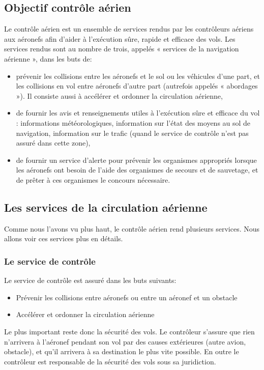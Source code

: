     \subsection{Objectif contrôle aérien}
Le contrôle aérien est un ensemble de services  rendus par les contrôleurs aériens aux aéronefs afin d'aider à l'exécution sûre, rapide et efficace des vols. Les services rendus sont au nombre de trois, appelés « services de la navigation aérienne », dans les buts de:
\begin{itemize}
    \item prévenir les collisions entre les aéronefs et le sol ou les véhicules d'une part, et les collisions en vol entre aéronefs d'autre part (autrefois appelés « abordages »). Il consiste aussi à accélérer et ordonner la circulation aérienne,
    \item de fournir les avis et renseignements utiles à l'exécution sûre et efficace du vol : informations météorologiques, information sur l'état des moyens au sol de navigation, information sur le trafic (quand le service de contrôle n'est pas assuré dans cette zone),
    \item de fournir un service d'alerte pour prévenir les organismes appropriés lorsque les aéronefs ont besoin de l'aide des organismes de secours et de sauvetage, et de prêter à ces organismes le concours nécessaire.
\end{itemize}\medskip

    \subsection{Les services de la circulation aérienne\label{servicesaerien}}
Comme nous l'avons vu plus haut, le contrôle aérien rend plusieurs services. Nous allons voir ces services plus en détails.

        \subsubsection{Le service de contrôle}
Le service de contrôle est assuré dans les buts suivants:
\begin{itemize}
    \item Prévenir les collisions entre aéronefs ou entre un aéronef et un obstacle
    \item Accélérer et ordonner la circulation aérienne
\end{itemize}\medskip

Le plus important reste donc la sécurité des vols. Le contrôleur s'assure que rien n'arrivera à l'aéronef pendant son vol par des causes extérieures (autre avion, obstacle), et qu'il arrivera à sa destination le plus vite possible. En outre le contrôleur est responsable de la sécurité des vols sous sa juridiction.

